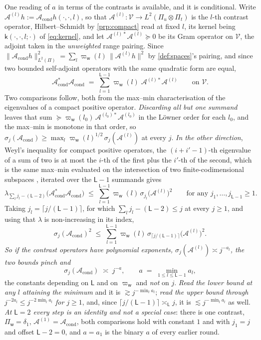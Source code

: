 One reading of $a$ in terms of the contrasts is available, and it is conditional. Write
$\mathcal A^{(l)}h:=\mathcal A_{\mathrm{cond}}h(\cdot,\cdot,l)$, so that
$\mathcal A^{(l)}:\mathcal V\to L^{2}(\Pi_u\otimes\Pi_t)$ is the $l$-th contrast operator, Hilbert--Schmidt
by \cref{prp:compact} read at fixed $l$, its kernel being $\mathsf k(\cdot,\cdot,l;\cdot)$ of
\eqref{eq:kernel}, and let $\mathcal A^{(l)\ast}\mathcal A^{(l)}\succeq0$ be its Gram operator on
$\mathcal V$, the adjoint taken in the \emph{unweighted} range pairing. Since
$\|\mathcal A_{\mathrm{cond}}h\|^{2}_{L^{2}(\Pi)}
=\sum_{l}\varpi_{\mathsf w}(l)\,\|\mathcal A^{(l)}h\|^{2}$ by \cref{def:spaces}'s pairing, and since two
bounded self-adjoint operators with the same quadratic form are equal,
\[
\mathcal A^{\ast}_{\mathrm{cond}}\mathcal A_{\mathrm{cond}}
\;=\;\sum_{l=1}^{\mathsf L-1}\varpi_{\mathsf w}(l)\;\mathcal A^{(l)\ast}\mathcal A^{(l)}
\qquad\text{on }\mathcal V .
\]
Two comparisons follow, both from the max--min characterisation of the eigenvalues of a compact positive
operator. \emph{Discarding all but one summand} leaves that sum $\succeq
\varpi_{\mathsf w}(l_0)\,\mathcal A^{(l_0)\ast}\mathcal A^{(l_0)}$ in the L\"owner order for each $l_0$,
and the max--min is monotone in that order, so
$\sigma_j(\mathcal A_{\mathrm{cond}})\ge\max_l\varpi_{\mathsf w}(l)^{1/2}\,\sigma_j(\mathcal A^{(l)})$ at
every $j$. \emph{In the other direction}, Weyl's inequality for compact positive operators, the
$(i+i'-1)$-th eigenvalue of a sum of two is at most the $i$-th of the first plus the $i'$-th of the
second, which is the same max--min evaluated on the intersection of two finite-codimensional subspaces
, iterated over the $\mathsf L-1$ summands gives
\[
\lambda_{\sum_lj_l-(\mathsf L-2)}\big(\mathcal A^{\ast}_{\mathrm{cond}}\mathcal A_{\mathrm{cond}}\big)
\;\le\;\sum_{l=1}^{\mathsf L-1}\varpi_{\mathsf w}(l)\,\sigma_{j_l}\big(\mathcal A^{(l)}\big)^{2}
\qquad\text{for any }j_1,\dots,j_{\mathsf L-1}\ge1 .
\]
Taking $j_l=\lceil j/(\mathsf L-1)\rceil$, for which $\sum_lj_l-(\mathsf L-2)\le j$ at every $j\ge1$, and
using that $\lambda$ is non-increasing in its index,
\[
\sigma_j(\mathcal A_{\mathrm{cond}})^{2}\;\le\;
\sum_{l=1}^{\mathsf L-1}\varpi_{\mathsf w}(l)\,\sigma_{\lceil j/(\mathsf L-1)\rceil}\big(\mathcal A^{(l)}\big)^{2} .
\]
\emph{So if the contrast operators have polynomial exponents, $\sigma_j(\mathcal A^{(l)})\asymp j^{-a_l}$,
the two bounds pinch and}
\[
\sigma_j(\mathcal A_{\mathrm{cond}})\;\asymp\;j^{-a},
\qquad
a\;=\;\min_{1\le l\le\mathsf L-1}a_l ,
\]
the constants depending on $\mathsf L$ and on $\varpi_{\mathsf w}$ and \emph{not} on $j$. \emph{Read the
lower bound at any $l$ attaining the minimum} and it is $\gtrsim j^{-\min_la_l}$; \emph{read the upper
bound through $j^{-2a_l}\le j^{-2\min_la_l}$ for $j\ge1$}, and, since
$\lceil j/(\mathsf L-1)\rceil\asymp_{\mathsf L}j$, it is $\lesssim j^{-\min_la_l}$ as well.
\emph{At $\mathsf L=2$ every step is an identity and
not a special case}: there is one contrast, $\Pi_{\mathsf w}=\delta_1$,
$\mathcal A^{(1)}=\mathcal A_{\mathrm{cond}}$, both comparisons hold with constant $1$ and with $j_1=j$
and offset $\mathsf L-2=0$, and $a=a_1$ is the binary $a$ of every earlier round.

